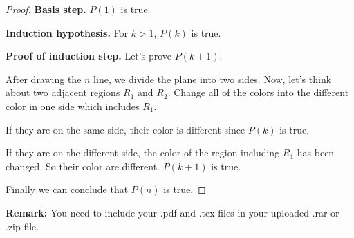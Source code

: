 \documentclass[12pt,a4paper]{article}
\theoremstyle{definition}
\begin{document}
\begin{enumerate}
\begin{proof}
        \textbf{Basis step.} $P(1)$ is true.

        \textbf{Induction hypothesis.} For $k>1$, $P(k)$ is true.

        \textbf{Proof of induction step.} Let's prove $P(k+1)$.

        After drawing the $n$ line, we divide the plane into two sides. 
        Now, let's think about two adjacent regions $R_1$ and $R_2$. Change all of the colors into the different color in one side which includes $R_1$.

        If they are on the same side, their color is different since $P(k)$ is true.

        If they are on the different side, the color of the region including $R_1$ has been changed.
        So their color are different. $P(k+1)$ is true.

        Finally we can conclude that $P(n)$ is true.

    \end{proof}

\end{enumerate}

\vspace{20pt}

\textbf{Remark:} You need to include your .pdf and .tex files in your uploaded .rar or .zip file.

\end{document}
